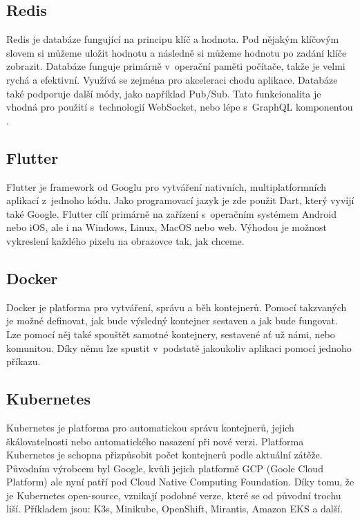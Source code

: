 \subsection{Redis}
Redis je databáze fungující na principu klíč a hodnota. Pod nějakým klíčovým slovem si můžeme uložit hodnotu a následně si můžeme hodnotu po zadání klíče zobrazit. Databáze funguje primárně v~operační paměti počítače, takže je velmi rychá a efektivní. Využívá se zejména pro akceleraci chodu aplikace. Databáze také podporuje další módy, jako například Pub/Sub\cite{PubSub}. Tato funkcionalita je vhodná pro použití s~technologií WebSocket, nebo lépe s~GraphQL komponentou .

\subsection{Flutter}
Flutter je framework od Googlu pro vytváření nativních, multiplatformních aplikací z~jednoho kódu. \cite{Flutter} Jako programovací jazyk je zde použit Dart, který vyvíjí také Google. Flutter cílí primárně na zařízení s~operačním systémem Android nebo iOS, ale i na Windows, Linux, MacOS nebo web. Výhodou je možnost vykreslení každého pixelu na obrazovce tak, jak chceme.

\subsection{Docker}
Docker je platforma pro vytváření, správu a běh kontejnerů. Pomocí takzvaných  je možné definovat, jak bude výsledný kontejner sestaven a jak bude fungovat. Lze pomocí něj také spouštět samotné kontejnery, sestavené ať už námi, nebo komunitou. Díky němu lze spustit v~podstatě jakoukoliv aplikaci pomocí jednoho příkazu.

\subsection{Kubernetes}
Kubernetes je platforma pro automatickou správu kontejnerů, jejich škálovatelnosti nebo automatického nasazení při nové verzi. Platforma Kubernetes je schopna přizpůsobit počet kontejnerů podle aktuální zátěže. 
Původním výrobcem byl Google, kvůli jejich platformě GCP (Goole Cloud Platform) ale nyní patří pod Cloud Native Computing Foundation. Díky tomu, že je Kubernetes open-source, vznikají podobné verze, které se od původní trochu liší. Příkladem jsou: K3s, Minikube, OpenShift, Mirantis, Amazon EKS a další.

